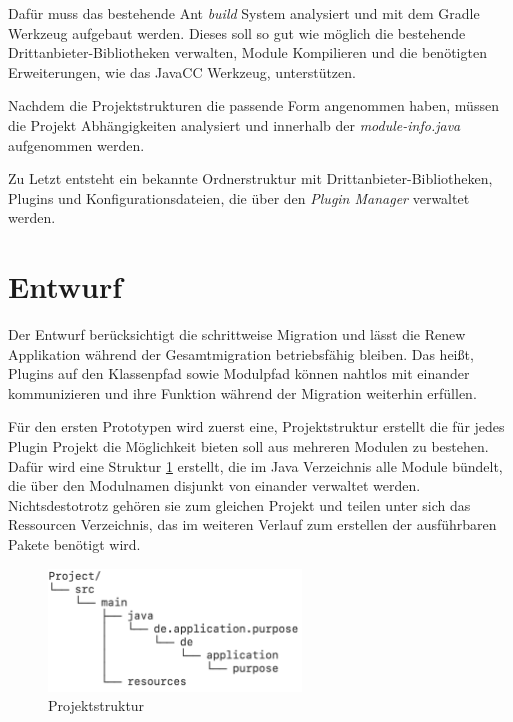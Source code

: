 Dafür muss das bestehende Ant \textit{build} System analysiert und mit dem Gradle Werkzeug aufgebaut werden. Dieses soll so gut wie möglich die bestehende Drittanbieter-Bibliotheken verwalten, Module Kompilieren und die benötigten Erweiterungen, wie das JavaCC Werkzeug, unterstützen.  
\bigbreak

Nachdem die Projektstrukturen die passende Form angenommen haben, müssen die Projekt Abhängigkeiten analysiert und innerhalb der \textit{module-info.java} aufgenommen werden. 
\bigbreak

Zu Letzt entsteht ein bekannte Ordnerstruktur mit Drittanbieter-Bibliotheken, Plugins und Konfigurationsdateien, die  über den \textit{Plugin Manager} verwaltet werden. 

\section{Entwurf}
Der Entwurf berücksichtigt die schrittweise Migration und lässt die Renew Applikation während der Gesamtmigration betriebsfähig bleiben. Das heißt, Plugins auf den Klassenpfad sowie Modulpfad können nahtlos mit einander kommunizieren und ihre Funktion während der Migration weiterhin erfüllen.   
\bigbreak

Für den ersten Prototypen wird zuerst eine, Projektstruktur erstellt die für jedes Plugin Projekt die Möglichkeit bieten soll aus mehreren Modulen zu bestehen. Dafür wird eine Struktur \ref{fig:projektstruktur} erstellt, die im Java Verzeichnis alle Module bündelt, die über den Modulnamen disjunkt von einander verwaltet werden. Nichtsdestotrotz gehören sie zum gleichen Projekt und teilen unter sich das Ressourcen Verzeichnis, das im weiteren Verlauf zum erstellen der ausführbaren Pakete benötigt wird.

\begin{figure}[h!]
  \centering
  \includegraphics[width=0.6\textwidth]{material/images/project-structure.png}
  \caption{Projektstruktur}
  \label{fig:projektstruktur}
\end{figure}
       
